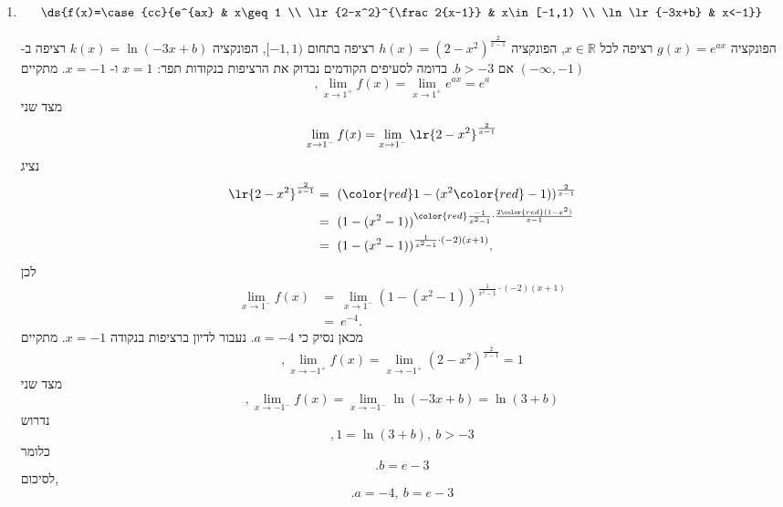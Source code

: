 \begin{enumerate}
\item $$\ds{f(x)=\case{cc}{e^{ax} & x\geq 1 \\ \lr{2-x^2}^{\frac2{x-1}} & x\in[-1,1) \\ \ln\lr{-3x+b} & x<-1}}$$
\begin{solbox}
הפונקציה
$g(x)=e^{ax}$
רציפה
לכל
$x\in\mathbb{R}$,
הפונקציה
$h(x)=(2-x^2)^{\frac{2}{x-1}}$
רציפה בתחום
$[-1,1)$,
הפונקציה
$k(x)=\ln(-3x+b)$
רציפה
ב-
$(-\infty,-1)$
אם
$b>-3$.
בדומה לסעיפים הקודמים נבדוק את הרציפות בנקודות תפר:
$x=1$
ו-
$x=-1$.
מתקיים
$$,\lim_{x\to1^+}f(x)=\lim_{x\to1^+}e^{ax}=e^a$$
מצד שני
    $$\lim_{x\to1^-}f(x)=\lim_{x\to1^-}\lr{2-x^2}^{\frac2{x-1}}$$
נציג
\begin{align*}
    \lr{2-x^2}^{\frac2{x-1}}&=\ ({\color{red}1}-(x^2{\color{red}-1}))^{\frac{2}{x-1}}\\
    &=\ (1-(x^2-1))^{{\color{red}\frac{-1}{x^2-1}}\cdot\frac{2{\color{red}(1-x^2)}}{x-1}}\\
    &=\ (1-(x^2-1))^{{\frac{1}{x^2-1}}\cdot(-2)(x+1)},
\end{align*}
לכן
\begin{align*}
    \lim_{x\to1^-}f(x)&=\ \lim_{x\to1^-}(1-(x^2-1))^{{\frac{1}{x^2-1}}\cdot(-2)(x+1)}\\
    &=\ e^{-4}.
\end{align*}
מכאן נסיק כי
$a=-4$.
נעבור לדיון ברציפות בנקודה
$x=-1$.
מתקיים
$$,\lim_{x\to-1^+}f(x)=\lim_{x\to-1^+}(2-x^2)^{\frac{2}{x-1}}=1$$
מצד שני
$$,\lim_{x\to-1^-}f(x)=\lim_{x\to-1^-}\ln(-3x+b)=\ln(3+b)$$
נדרוש
$$,1=\ln(3+b),\ b> -3$$
כלומר
$$.b=e-3$$
לסיכום,
$$.a=-4,\ b=e-3$$
\end{solbox}


\end{enumerate}
